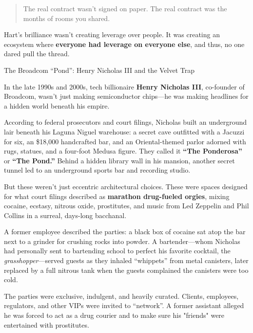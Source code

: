 \begin{quote}
The real contract wasn’t signed on paper.  The real contract was the months of rooms you shared.
\end{quote}

Hart’s brilliance wasn’t creating leverage over people. It was creating an ecosystem where \textbf{everyone had leverage on everyone else}, and thus, no one dared pull the thread.

\medskip

\begin{HistoricalSidebar}{The Broadcom ``Pond'': Henry Nicholas III and the Velvet Trap}

  In the late 1990s and 2000s, tech billionaire \textbf{Henry Nicholas III}, co-founder of Broadcom, wasn’t just making semiconductor chips—he was making headlines for a hidden world beneath his empire.

  \medskip
  
  According to federal prosecutors and court filings, Nicholas built an underground lair beneath his Laguna Niguel warehouse: a secret cave outfitted with a Jacuzzi for six, an \$18{,}000 handcrafted bar, and an Oriental-themed parlor adorned with rugs, statues, and a four-foot Medusa figure. They called it \textbf{“The Ponderosa”} or \textbf{“The Pond.”} Behind a hidden library wall in his mansion, another secret tunnel led to an underground sports bar and recording studio.

  \medskip
  
  But these weren’t just eccentric architectural choices. These were spaces designed for what court filings described as \textbf{marathon drug-fueled orgies}, mixing cocaine, ecstasy, nitrous oxide, prostitutes, and music from Led Zeppelin and Phil Collins in a surreal, days-long bacchanal.

  \medskip
  
  A former employee described the parties: a black box of cocaine sat atop the bar next to a grinder for crushing rocks into powder. A bartender—whom Nicholas had personally sent to bartending school to perfect his favorite cocktail, the \emph{grasshopper}—served guests as they inhaled “whippets” from metal canisters, later replaced by a full nitrous tank when the guests complained the canisters were too cold.

  \medskip
  
  The parties were exclusive, indulgent, and heavily curated. Clients, employees, regulators, and other VIPs were invited to ``network''. A former assistant alleged he was forced to act as a drug courier and to make sure his "friends" were entertained with prostitutes.


\end{HistoricalSidebar}
